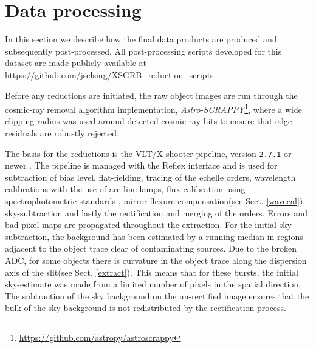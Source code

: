 \documentclass[longauth]{aa}    %
\begin{document}
\section{Data processing} \label{proc}

In this section we describe how the final data products are produced and
subsequently post-processed. 
All post-processing scripts developed for this dataset are made publicly
available at \url{https://github.com/jselsing/XSGRB_reduction_scripts}.

Before any reductions are initiated, the raw object images are run through the
cosmic-ray removal algorithm \citep{VanDokkum2001} implementation,
\textit{Astro-SCRAPPY}\footnote{\url{https://github.com/astropy/astroscrappy}},
where a wide clipping radius was used around detected cosmic ray hits to ensure
that edge residuals are robustly rejected.

The basis for the reductions is the VLT/X-shooter pipeline, version
\texttt{2.7.1} or newer \citep{Goldoni2006, Modigliani2010}. The pipeline is
managed with the Reflex interface \citep{Freudling2013} and is used for
subtraction of bias level, flat-fielding, tracing of the echelle orders,
wavelength calibrations with the use of arc-line lamps, flux calibration using
spectrophotometric standards \citep{Vernet2010, Hamuy1994}, mirror flexure
compensation(see Sect. \ref{wavecal}), sky-subtraction and lastly the
rectification and merging of the orders. Errors and bad pixel maps are
propagated throughout the extraction. For the initial sky-subtraction, the
background has been estimated by a running median in regions adjacent to the
object trace clear of contaminating sources. Due to the broken ADC, for some
objects there is curvature in the object trace along the dispersion axis of the
slit(see Sect. \ref{extract}). This means that for these bursts, the initial
sky-estimate was made from a limited number of pixels in the spatial direction.
The subtraction of the sky background on the un-rectified image ensures that the
bulk of the sky background is not redistributed by the rectification process.
\end{document}

